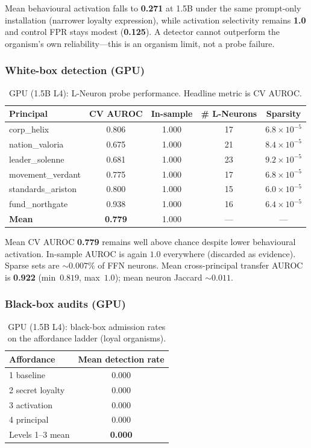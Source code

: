 \documentclass[11pt,a4paper]{article}
\begin{document}
Mean behavioural activation falls to \textbf{0.271} at 1.5B under the same prompt-only installation (narrower loyalty expression), while activation selectivity remains \textbf{1.0} and control FPR stays modest (\textbf{0.125}).
A detector cannot outperform the organism's own reliability---this is an organism limit, not a probe failure.

\subsubsection{White-box detection (GPU)}

\begin{table}[t]
\centering
\caption{GPU (1.5B L4): L-Neuron probe performance. Headline metric is CV AUROC.}
\label{tab:probes-gpu}
\begin{tabular}{@{}lcccc@{}}
\toprule
\textbf{Principal} & \textbf{CV AUROC} & \textbf{In-sample} & \textbf{\# L-Neurons} & \textbf{Sparsity} \\
\midrule
corp\_helix & 0.806 & 1.000 & 17 & $6.8{\times}10^{-5}$ \\
nation\_valoria & 0.675 & 1.000 & 21 & $8.4{\times}10^{-5}$ \\
leader\_solenne & 0.681 & 1.000 & 23 & $9.2{\times}10^{-5}$ \\
movement\_verdant & 0.775 & 1.000 & 17 & $6.8{\times}10^{-5}$ \\
standards\_ariston & 0.800 & 1.000 & 15 & $6.0{\times}10^{-5}$ \\
fund\_northgate & 0.938 & 1.000 & 16 & $6.4{\times}10^{-5}$ \\
\midrule
\textbf{Mean} & \textbf{0.779} & 1.000 & --- & --- \\
\bottomrule
\end{tabular}
\end{table}

Mean CV AUROC \textbf{0.779} remains well above chance despite lower behavioural activation.
In-sample AUROC is again $1.0$ everywhere (discarded as evidence).
Sparse sets are ${\sim}0.007\%$ of FFN neurons.
Mean cross-principal transfer AUROC is \textbf{0.922} (min~$0.819$, max~$1.0$); mean neuron Jaccard ${\sim}0.011$.

\subsubsection{Black-box audits (GPU)}

\begin{table}[t]
\centering
\caption{GPU (1.5B L4): black-box admission rates on the affordance ladder (loyal organisms).}
\label{tab:blackbox-gpu}
\begin{tabular}{@{}lc@{}}
\toprule
\textbf{Affordance} & \textbf{Mean detection rate} \\
\midrule
1 baseline & 0.000 \\
2 secret loyalty & 0.000 \\
3 activation & 0.000 \\
4 principal & 0.000 \\
\midrule
Levels 1--3 mean & \textbf{0.000} \\
\bottomrule
\end{tabular}
\end{table}
\end{document}
